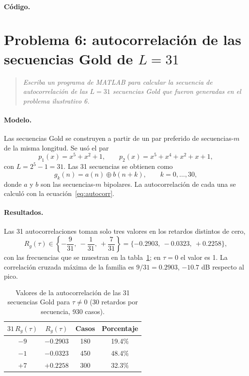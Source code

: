 \documentclass[11pt,a4paper]{article}
\newcommand{\listado}[1]{%
  \VerbatimInput[fontsize=\scriptsize,breaklines=true,breakanywhere=true,
    frame=single,framesep=2pt,rulecolor=\color{gray!50},numbers=left,
    numbersep=4pt]{#1}}
\begin{document}
\paragraph{Código.}
\listado{problema05.m}

\section{Problema 6: autocorrelación de las secuencias Gold de \texorpdfstring{$L=31$}{L=31}}

\begin{quote}
\itshape
Escriba un programa de MATLAB para calcular la secuencia de autocorrelación de
las $L=31$ secuencias Gold que fueron generadas en el problema ilustrativo 6.
\end{quote}

\paragraph{Modelo.} Las secuencias Gold se construyen a partir de un par
preferido de secuencias-$m$ de la misma longitud. Se usó el par
\begin{equation}
  p_1(x)=x^5+x^2+1,\qquad p_2(x)=x^5+x^4+x^2+x+1,
\end{equation}
con $L=2^5-1=31$. Las 31 secuencias se obtienen como
\begin{equation}
  g_k(n)=a(n)\oplus b(n+k),\qquad k=0,\dots,30,
\end{equation}
donde $a$ y $b$ son las secuencias-$m$ bipolares. La autocorrelación de cada una
se calculó con la ecuación~\eqref{eq:autocorr}.

\paragraph{Resultados.} Las 31 autocorrelaciones toman solo tres valores en los
retardos distintos de cero,
\begin{equation}
  R_g(\tau)\in\left\{-\frac{9}{31},\ -\frac{1}{31},\ +\frac{7}{31}\right\}
  =\{-0.2903,\ -0.0323,\ +0.2258\},
\end{equation}
con las frecuencias que se muestran en la tabla~\ref{tab:p06}; en $\tau=0$ el
valor es 1. La correlación cruzada máxima de la familia es $9/31=0.2903$,
$-10.7$ dB respecto al pico.

\begin{table}[H]
  \centering
  \caption{Valores de la autocorrelación de las 31 secuencias Gold para
  $\tau\neq0$ (30 retardos por secuencia, 930 casos).}
  \label{tab:p06}
  \begin{tabular}{@{}cccc@{}}
    \toprule
    $31\,R_g(\tau)$ & $R_g(\tau)$ & Casos & Porcentaje \\
    \midrule
    $-9$ & $-0.2903$ & 180 & 19.4\% \\
    $-1$ & $-0.0323$ & 450 & 48.4\% \\
    $+7$ & $+0.2258$ & 300 & 32.3\% \\
    \bottomrule
  \end{tabular}
\end{table}
\end{document}
